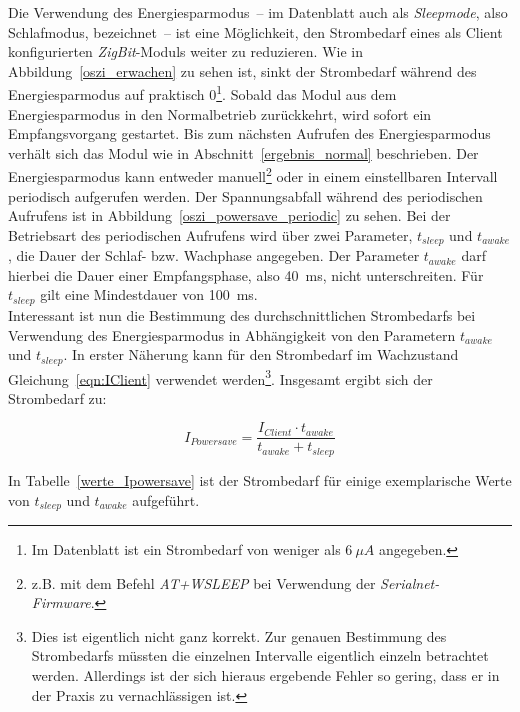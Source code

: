 Die Verwendung des Energiesparmodus~-- im Datenblatt auch als \emph{Sleepmode}, also Schlafmodus, bezeichnet~-- ist eine
Möglichkeit, den Strombedarf eines als Client konfigurierten \emph{ZigBit}-Moduls weiter zu reduzieren. Wie in 
Abbildung~\ref{oszi_erwachen} zu sehen ist, sinkt der Strombedarf während des Energiesparmodus auf praktisch 
0\footnote{Im Datenblatt ist ein Strombedarf von weniger als $6~\mu{}A$ angegeben.}. Sobald das Modul aus dem 
Energiesparmodus in den Normalbetrieb zurückkehrt, wird sofort ein Empfangsvorgang gestartet. Bis zum nächsten Aufrufen des 
Energiesparmodus verhält sich das Modul wie in Abschnitt~\ref{ergebnis_normal} beschrieben. Der Energiesparmodus kann
entweder manuell\footnote{z.B. mit dem Befehl \emph{AT+WSLEEP} bei Verwendung der \emph{Serialnet-Firmware}.} oder in einem 
einstellbaren Intervall periodisch aufgerufen werden. Der Spannungsabfall während des periodischen Aufrufens ist in
Abbildung~\ref{oszi_powersave_periodic} zu sehen. Bei der Betriebsart des periodischen Aufrufens wird über zwei Parameter,
$t_{sleep}$ und $t_{awake}$, die Dauer der Schlaf- bzw. Wachphase angegeben. Der Parameter $t_{awake}$ darf hierbei die Dauer
einer Empfangsphase, also 40~ms, nicht unterschreiten. Für $t_{sleep}$ gilt eine Mindestdauer von 100~ms.\\
Interessant ist nun die Bestimmung des durchschnittlichen Strombedarfs bei Verwendung des Energiesparmodus
in Abhängigkeit von den Parametern $t_{awake}$ und $t_{sleep}$. In erster Näherung kann für den Strombedarf im Wachzustand
Gleichung~\ref{eqn:IClient} verwendet werden\footnote{Dies ist eigentlich nicht ganz korrekt.
Zur genauen Bestimmung des Strombedarfs müssten die einzelnen Intervalle 
eigentlich einzeln betrachtet werden. Allerdings ist der sich hieraus ergebende Fehler so gering, dass er in der Praxis zu 
vernachlässigen ist.}. Insgesamt ergibt sich der Strombedarf zu:

\begin{equation}
   I_{Powersave} = \frac{I_{Client} \cdot t_{awake}}{t_{awake} + t_{sleep}}
\end{equation}

In Tabelle~\ref{werte_Ipowersave} ist der Strombedarf für einige exemplarische Werte von $t_{sleep}$ und $t_{awake}$ 
aufgeführt.

